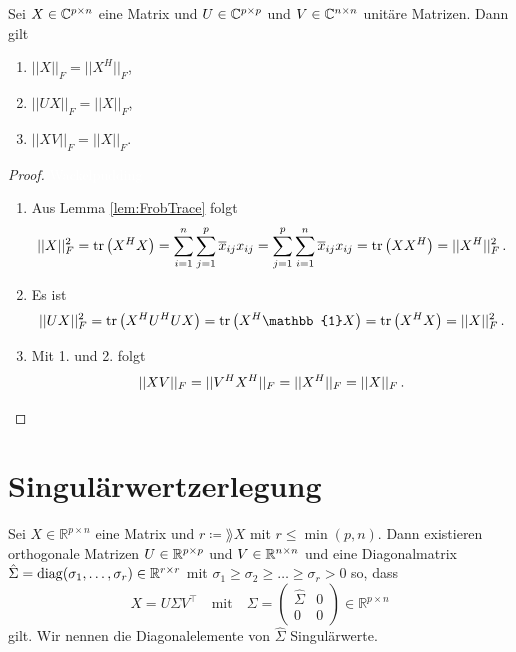 \documentclass[../Bachelor_LennartKoliwer.tex]{subfiles}
\begin{document}
\begin{lemma}
	Sei $X\in\mathbb{C}^{p\times n}$ eine Matrix und \(U\in\mathbb{C}^{p\times p}\) und \(V\in\mathbb{C}^{n\times n}\) unitäre Matrizen. Dann gilt
	\begin{enumerate}
		\item \(||X||_F =||X^H||_F\),
		\item \(||UX||_F =||X||_F\),
		\item \(||XV||_F =||X||_F\).
	\end{enumerate}
\end{lemma}
\begin{proof}\textcolor{white}{Wackelpudding} %
	\begin{enumerate}
		\item Aus Lemma \ref{lem:FrobTrace} folgt
		      \[
			      ||X||_F^2 = \operatorname{tr} \left(X^HX\right) = \sum_{i=1}^{n}\sum_{j=1}^{p} \overline{x}_{ij} x_{ij} = \sum_{j=1}^{p}\sum_{i=1}^{n} \overline{x}_{ij} x_{ij} = \operatorname{tr}\left(XX^H\right) = ||X^H||_F^2 \,.
		      \]
		\item Es ist
		      \[
			      ||UX||_F^2 = \tr \left(X^HU^HUX\right) =\tr \left(X^H\mathbb{1}X\right) = \tr \left(X^HX\right) = ||X||_F^2\,.
		      \]
		\item Mit 1. und 2. folgt
		      \[
			      ||XV||_F = ||V^HX^H||_F = ||X^H||_F = ||X||_F\,. \qedhere
		      \]%
	\end{enumerate}
\end{proof}



\section{Singulärwertzerlegung}\label{chap:SWZ}

\begin{theorem} \label{theo:svd}
	Sei \(X\in \mathbb{R}^{p\times n} \) eine Matrix und ${r\coloneqq \rang X}$ mit $r\leq \min(p,n)$.
	Dann existieren orthogonale Matrizen \(U\in\mathbb{R}^{p\times p}\) und \(V\in\mathbb{R}^{n\times n}\) und eine Diagonalmatrix \(\hat{\Sigma}=\operatorname{diag}(\sigma_1,\dots,\sigma_r)\in\mathbb{R}^{r\times r}\) mit $\sigma_1 \geq \sigma_2 \geq \dots \geq \sigma_r > 0$ so, dass 
	\[
		X = U\Sigma V^\top \quad\text{mit}\quad \Sigma = \begin{pmatrix}
			\hat{\Sigma} & 0 \\
			0            & 0
		\end{pmatrix} \in \mathbb{R}^{p\times n}
	\]
	gilt.
	Wir nennen die Diagonalelemente von $\hat{\Sigma}$ Singulärwerte.
\end{theorem}
\end{document}
